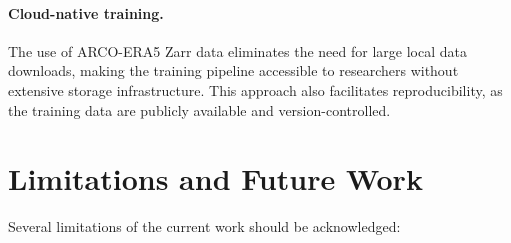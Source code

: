 \documentclass[11pt]{article}
\begin{document}
\paragraph{Cloud-native training.} The use of ARCO-ERA5 Zarr data eliminates the need for large local data downloads, making the training pipeline accessible to researchers without extensive storage infrastructure. This approach also facilitates reproducibility, as the training data are publicly available and version-controlled.

\section{Limitations and Future Work}
\label{sec:limitations}

Several limitations of the current work should be acknowledged:
\end{document}
